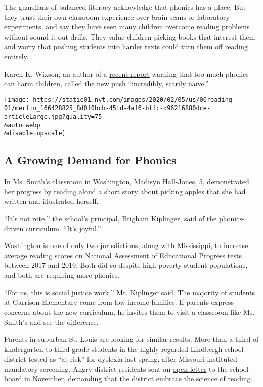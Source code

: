 The guardians of balanced literacy acknowledge that phonics has a place.
But they trust their own classroom experience over brain scans or
laboratory experiments, and say they have seen many children overcome
reading problems without sound-it-out drills. They value children
picking books that interest them and worry that pushing students into
harder texts could turn them off reading entirely.

Karen K. Wixson, an author of a
\href{https://www.literacyworldwide.org/docs/default-source/where-we-stand/ila-children-experiencing-reading-difficulties.pdf}{recent
report} warning that too much phonics can harm children, called the new
push ``incredibly, scarily naïve.''

\texttt{[image: https://static01.nyt.com/images/2020/02/05/us/00reading-01/merlin\_166428825\_8d0f0bcb-45fd-4af6-bffc-d96216880dce-articleLarge.jpg?quality=75\\\&auto=webp\\\&disable=upscale]}

\hypertarget{a-growing-demand-for-phonics}{%
\subsection{A Growing Demand for
Phonics}\label{a-growing-demand-for-phonics}}

In Ms. Smith's classroom in Washington, Madisyn Hall-Jones, 5,
demonstrated her progress by reading aloud a short story about picking
apples that she had written and illustrated herself.

``It's not rote,'' the school's principal, Brigham Kiplinger, said of
the phonics-driven curriculum. ``It's joyful.''

Washington is one of only two jurisdictions, along with Mississippi, to
\href{https://www.nationsreportcard.gov/mathematics/supportive_files/2019_infographic.pdf}{increase}
average reading scores on National Assessment of Educational Progress
tests between 2017 and 2019. Both did so despite high-poverty student
populations, and both are requiring more phonics.

``For us, this is social justice work,'' Mr. Kiplinger said. The
majority of students at Garrison Elementary come from low-income
families. If parents express concerns about the new curriculum, he
invites them to visit a classroom like Ms. Smith's and see the
difference.

Parents in suburban St. Louis are looking for similar results. More than
a third of kindergarten to third-grade students in the highly regarded
Lindbergh school district tested as ``at risk'' for dyslexia last
spring, after Missouri instituted mandatory screening. Angry district
residents sent an
\href{https://docs.google.com/document/d/17PZ1w1TEjcSZnlhCCnyAld6rF3X3pdNjTpOhPE4YuD8/edit?fbclid=IwAR25mkkUcWVAogUBwTQ3cl6VWXjdRwW9wi5Igk6J2SdgFGXCMImSMR2d5eY}{open
letter} to the school board in November, demanding that the district
embrace the science of reading.

